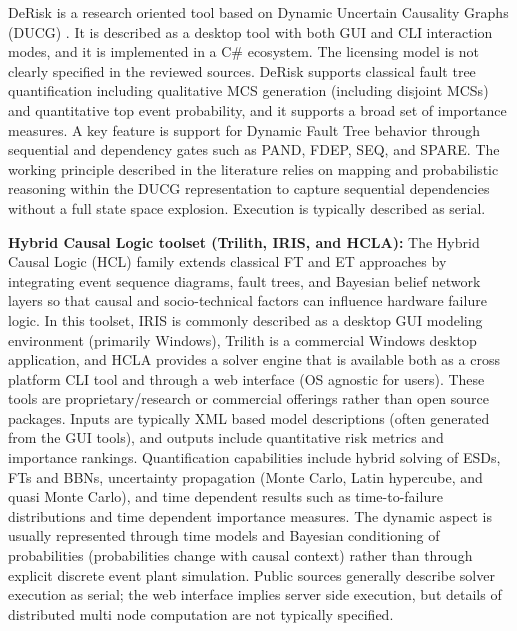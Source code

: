 DeRisk \cite{derisk_2018} is a research oriented tool based on Dynamic Uncertain Causality Graphs (DUCG) \cite{ducg_2012}. It is described as a desktop tool with both GUI and CLI interaction modes, and it is implemented in a C\# ecosystem. The licensing model is not clearly specified in the reviewed sources. DeRisk supports classical fault tree quantification including qualitative MCS generation (including disjoint MCSs) and quantitative top event probability, and it supports a broad set of importance measures. A key feature is support for Dynamic Fault Tree behavior through sequential and dependency gates such as PAND, FDEP, SEQ, and SPARE. The working principle described in the literature relies on mapping and probabilistic reasoning within the DUCG representation to capture sequential dependencies without a full state space explosion. Execution is typically described as serial.

\textbf{Hybrid Causal Logic toolset (Trilith, IRIS, and HCLA):}
The Hybrid Causal Logic (HCL) family extends classical FT and ET approaches by integrating event sequence diagrams, fault trees, and Bayesian belief network layers so that causal and socio-technical factors can influence hardware failure logic. In this toolset, IRIS \cite{iris_2007} is commonly described as a desktop GUI modeling environment (primarily Windows), Trilith \cite{trilith_2010} is a commercial Windows desktop application, and HCLA \cite{hcla_web} provides a solver engine that is available both as a cross platform CLI tool and through a web interface (OS agnostic for users). These tools are proprietary/research or commercial offerings rather than open source packages. Inputs are typically XML based model descriptions (often generated from the GUI tools), and outputs include quantitative risk metrics and importance rankings. Quantification capabilities include hybrid solving of ESDs, FTs and BBNs, uncertainty propagation (Monte Carlo, Latin hypercube, and quasi Monte Carlo), and time dependent results such as time-to-failure distributions and time dependent importance measures. The dynamic aspect is usually represented through time models and Bayesian conditioning of probabilities (probabilities change with causal context) rather than through explicit discrete event plant simulation. Public sources generally describe solver execution as serial; the web interface implies server side execution, but details of distributed multi node computation are not typically specified.

